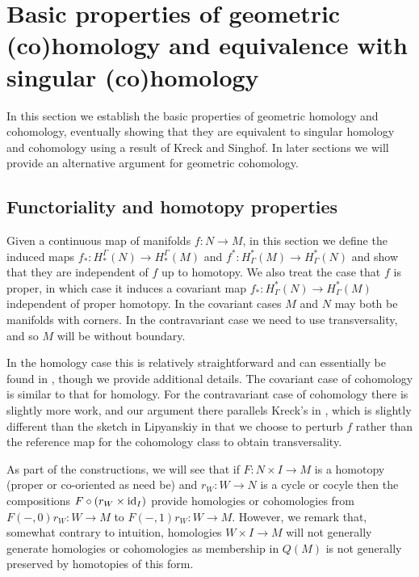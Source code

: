 


\section{Basic properties of geometric (co)homology and equivalence with singular (co)homology}\label{S: basic properties}


In this section we establish the basic properties of geometric homology and cohomology, eventually showing that they are equivalent to singular homology and cohomology using a result of Kreck and Singhof. In later sections we will provide an alternative argument for geometric cohomology.


\subsection{Functoriality and homotopy properties}\label{S: functoriality}


Given a continuous map of manifolds $f:N\to M$, in this section we define the induced maps $f_*:H_*^\Gamma(N)\to H_*^\Gamma(M)$ and $f^*:H^*_\Gamma(M)\to H^*_\Gamma(N)$ and show that they are independent of $f$ up to homotopy. We also treat the case that $f$ is proper, in which case it induces a covariant map $f_*:H^*_\Gamma(N)\to H^*_\Gamma(M)$ independent of proper homotopy. In the covariant cases $M$ and $N$ may both be manifolds with corners. In the contravariant case we need to use transversality, and so $M$ will be without boundary.



In the homology case this is relatively straightforward and can essentially be found in \cite[Section 6]{Lipy14}, though we provide additional details. The covariant case of cohomology is similar to that for homology.  For the contravariant case of  cohomology there is slightly more work, and our argument there parallels Kreck's in \cite{Krec10}, which is slightly different than the sketch in Lipyanskiy \cite[Section 6]{Lipy14} in that we choose to perturb $f$ rather than the reference map for the cohomology class to obtain transversality.

As part of the constructions, we will see that if $F:N\times I\to M$ is a homotopy (proper or co-oriented as need be) and $r_W \colon W \to N$ is a cycle or cocyle then the compositions $F\circ (r_W\times \mathrm{id}_I)$  provide homologies or cohomologies from $F(-,0)r_W \colon W \to M$ to $F(-,1)r_W \colon W \to M$. However, we remark that, somewhat contrary to intuition, homologies $W\times I\to M$ will not generally generate homologies or cohomologies as membership in $Q(M)$ is not generally preserved by homotopies of this form.



